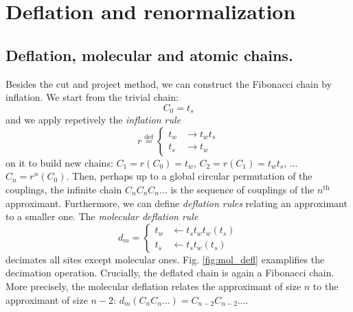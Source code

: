 \documentclass[11pt]{article}
\newcommand{\define}{\ensuremath{ \overset{\text{def}}{=} }}
\begin{document}
\section{Deflation and renormalization}

\subsection{Deflation, molecular and atomic chains.}
Besides the cut and project method, we can construct the Fibonacci chain by inflation.
We start from the trivial chain:
\begin{equation}
	C_0 = t_s
\end{equation}
and we apply repetively the \emph{inflation rule}
\begin{equation}
	r \define \begin{cases}
        t_{w} & \rightarrow t_w t_s \\
        t_s & \rightarrow t_w
      \end{cases}
\end{equation} 
on it to build new chains: $C_1 = r(C_0) = t_w$, $C_2 = r(C_1) = t_w t_s$, ... $C_n = r^n(C_0)$.
Then, perhaps up to a global circular permutation of the couplings, the infinite chain $C_n C_n C_n \dots$ is the sequence of couplings of the $n^\text{th}$ approximant.
Furthermore, we can define \emph{deflation rules} relating an approximant to a smaller one.
The \emph{molecular deflation rule}
\begin{equation}
	d_m = \begin{cases}
        t_{w} & \leftarrow t_s t_w t_w (t_s)\\
        t_s & \leftarrow t_s t_w (t_s)
      \end{cases}
\end{equation}
decimates all sites except molecular ones. Fig. \eqref{fig:mol_defl} examplifies the decimation operation.
Crucially, the deflated chain is again a Fibonacci chain. More precisely, the molecular deflation relates the approximant of size $n$ to the approximant of size $n-2$: $d_m(C_n C_n \dots) = C_{n-2} C_{n-2} \dots$.
\end{document}
